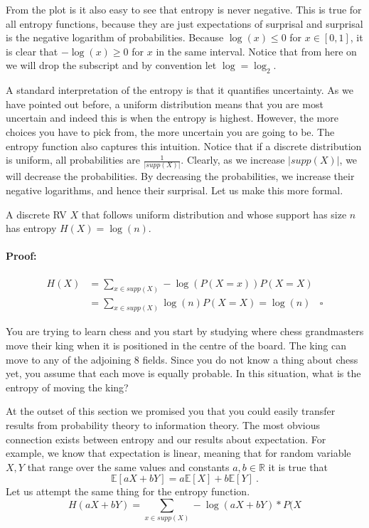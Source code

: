 From the plot is it also easy to see that entropy is never negative. This is true for all entropy functions,
because they are just expectations of surprisal and surprisal is the negative logarithm of probabilities. 
Because $ \log(x) \leq 0 $ for $ x \in [0,1] $, it is clear that $ -\log(x) \geq 0 $ for $ x $ in the same
interval. Notice that from here on we will drop the subscript and by convention let $ \log = \log_{2} $.

A standard interpretation of the entropy is that it quantifies uncertainty. As we have pointed out
before, a uniform distribution means that you are most uncertain and indeed this is when the entropy
is highest. However, the more choices you have to pick from, the more uncertain you are going to be. 
The entropy function also captures this intuition. Notice that if a discrete distribution is uniform,
all probabilities are $ \frac{1}{|supp(X)|} $. Clearly, as we increase $ |supp(X)| $, we will decrease the
probabilities. By decreasing the probabilities, we increase their negative logarithms, and hence their
surprisal. Let us make this more formal.

\begin{Theorem}
A discrete RV $ X $ that follows uniform distribution and whose support has size $ n $ has entropy
$ H(X) = \log(n) $.
\end{Theorem}

\paragraph{Proof:}
\begin{align}
H(X) &= \underset{x \in supp(X)}{\sum}-\log(P(X=x))P(X=X) \\
&= \underset{x \in supp(X)}{\sum}\log(n)P(X=X) = \log(n)~~~~\square
\end{align}

\begin{Exercise}
You are trying to learn chess and you start by studying where chess grandmasters move their king when it
is positioned in the centre of the board. The king can move to any of the adjoining 8 fields. Since
you do not know a thing about chess yet, you assume that each move is equally probable. In this situation,
what is the entropy of moving the king?
\end{Exercise}

At the outset of this section we promised you that you could easily transfer results from probability 
theory to information theory. The most obvious connection exists between entropy and our results about
expectation. For example, we know that expectation is linear, meaning that for random variable $ X,Y $
that range over the same values and constants $ a,b \in \mathbb{R} $ it is true that
\begin{equation}
\mathbb{E}[aX+bY] = a\mathbb{E}[X] + b\mathbb{E}[Y] \ .
\end{equation}
Let us attempt the same thing for the entropy function.
\begin{equation}
H(aX + bY) = \underset{x \in supp(X)}{\sum} -\log(aX + bY)*P(X 
\end{equation}